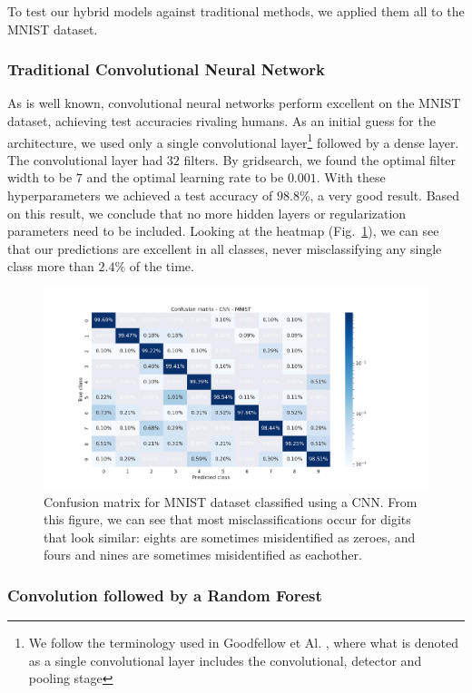 \documentclass[onecolumn,10pt,cleanfoot]{asme2ej}
\begin{document}
To test our hybrid models against traditional methods, we applied them all to the MNIST dataset.

\subsubsection{Traditional Convolutional Neural Network}

As is well known, convolutional neural networks perform excellent on the MNIST dataset, achieving test accuracies rivaling humans. As an initial guess for the architecture, we used only a single convolutional layer\footnote{We follow the terminology used in Goodfellow et Al. \cite[336]{gbc}, where what is denoted as a single convolutional layer includes the convolutional, detector and pooling stage} followed by a dense layer. The convolutional layer had $32$ filters. By gridsearch, we found the optimal filter width to be $7$ and the optimal learning rate to be $0.001$. With these hyperparameters we achieved a test accuracy of $98.8\%$, a very good result. Based on this result, we conclude that no more hidden layers or regularization parameters need to be included. Looking at the heatmap (Fig.~\ref{mnistheatmap_cnn}), we can see that our predictions are excellent in all classes, never misclassifying any single class more than $2.4\%$ of the time.

\begin{figure}[H]
\centerline{\includegraphics[width=8in]{figure/conf_cnn_MNIST.png}}
\caption{Confusion matrix for MNIST dataset classified using a CNN. From this figure, we can see that most misclassifications occur for digits that look similar: eights are sometimes misidentified as zeroes, and fours and nines are sometimes misidentified as eachother.}
\label{mnistheatmap_cnn}
\end{figure}

\subsubsection{Convolution followed by a Random Forest}
\end{document}
